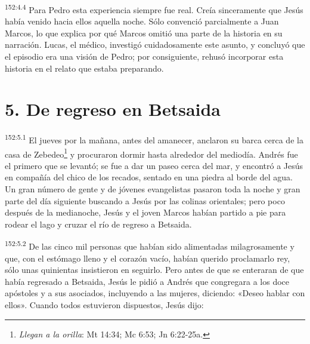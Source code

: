 \par
\textsuperscript{152:4.4} Para Pedro esta experiencia siempre fue real. Creía sinceramente que Jesús había venido hacia ellos aquella noche. Sólo convenció parcialmente a Juan Marcos, lo que explica por qué Marcos omitió una parte de la historia en su narración. Lucas, el médico, investigó cuidadosamente este asunto, y concluyó que el episodio era una visión de Pedro; por consiguiente, rehusó incorporar esta historia en el relato que estaba preparando.

\section*{5. De regreso en Betsaida}
\par
\textsuperscript{152:5.1} El jueves por la mañana, antes del amanecer, anclaron su barca cerca de la casa de Zebedeo\footnote{\textit{Llegan a la orilla}: Mt 14:34; Mc 6:53; Jn 6:22-25a.} y procuraron dormir hasta alrededor del mediodía. Andrés fue el primero que se levantó; se fue a dar un paseo cerca del mar, y encontró a Jesús en compañía del chico de los recados, sentado en una piedra al borde del agua. Un gran número de gente y de jóvenes evangelistas pasaron toda la noche y gran parte del día siguiente buscando a Jesús por las colinas orientales; pero poco después de la medianoche, Jesús y el joven Marcos habían partido a pie para rodear el lago y cruzar el río de regreso a Betsaida.

\par
\textsuperscript{152:5.2} De las cinco mil personas que habían sido alimentadas milagrosamente y que, con el estómago lleno y el corazón vacío, habían querido proclamarlo rey, sólo unas quinientas insistieron en seguirlo. Pero antes de que se enteraran de que había regresado a Betsaida, Jesús le pidió a Andrés que congregara a los doce apóstoles y a sus asociados, incluyendo a las mujeres, diciendo: «Deseo hablar con ellos». Cuando todos estuvieron dispuestos, Jesús dijo:

